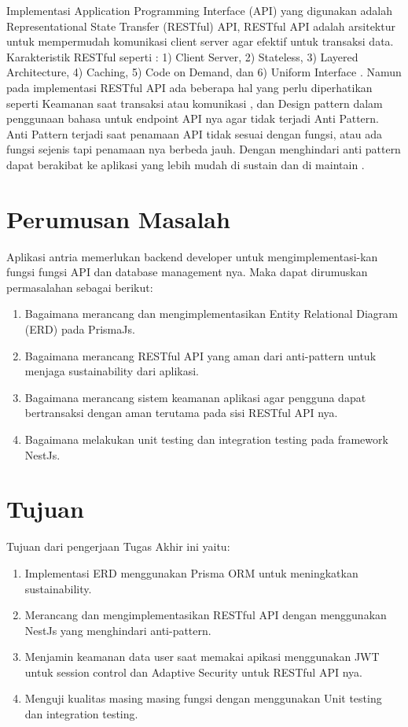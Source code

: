 Implementasi Application Programming Interface (API) yang digunakan adalah Representational State Transfer (RESTful) API, RESTful API adalah arsitektur untuk mempermudah komunikasi client server agar efektif untuk transaksi data. Karakteristik RESTful seperti : 1) Client Server, 2) Stateless, 3) Layered Architecture, 4) Caching, 5) Code on Demand, dan 6) Uniform Interface \cite{giessler2015best}. Namun pada implementasi RESTful API ada beberapa hal yang perlu diperhatikan seperti Keamanan saat transaksi  atau komunikasi \cite{Beer2018}, dan Design pattern dalam penggunaan bahasa untuk endpoint API nya agar tidak terjadi Anti Pattern. Anti Pattern terjadi saat penamaan API tidak sesuai dengan fungsi, atau ada fungsi sejenis tapi penamaan nya berbeda jauh. Dengan menghindari anti pattern dapat berakibat ke aplikasi yang lebih mudah di sustain dan di maintain \cite{Aghajani2018} \cite{Alshraiedeh2021}.

\section{Perumusan Masalah}
Aplikasi antria memerlukan backend developer untuk mengimplementasi-kan fungsi fungsi API dan database management nya. Maka dapat dirumuskan permasalahan sebagai berikut:
\begin{enumerate}
  \item Bagaimana merancang dan mengimplementasikan Entity Relational Diagram (ERD) pada PrismaJs.
  \item Bagaimana merancang RESTful API yang aman dari anti-pattern untuk menjaga sustainability dari aplikasi.
  \item Bagaimana merancang sistem keamanan aplikasi agar pengguna dapat bertransaksi dengan aman terutama pada sisi RESTful API nya.
  \item Bagaimana melakukan unit testing dan integration testing pada framework NestJs.
\end{enumerate}


\section{Tujuan}
Tujuan dari pengerjaan Tugas Akhir ini yaitu:
\begin{enumerate}
  \item Implementasi ERD menggunakan Prisma ORM untuk meningkatkan sustainability.
  \item Merancang dan mengimplementasikan RESTful API dengan menggunakan NestJs yang menghindari anti-pattern.
  \item Menjamin keamanan data user saat memakai apikasi menggunakan JWT untuk session control dan Adaptive Security untuk RESTful API nya.
  \item Menguji kualitas masing masing fungsi dengan menggunakan Unit testing dan integration testing.
\end{enumerate}

